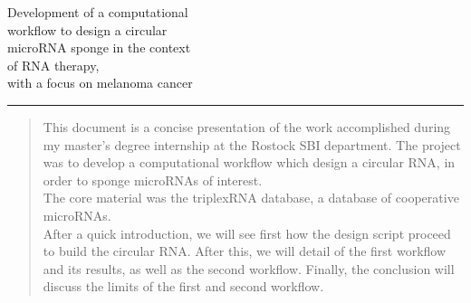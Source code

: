 \documentclass[a4paper,12pt]{report}
\begin{document}
\begin{titlepage}
	\BgThispage
	\vspace*{0.11\textheight}
	\noindent
	\textcolor{yourcolor}{\Huge{Development of a computational \\ \newline  workflow to design a circular \\ \newline microRNA sponge  in the context \\ \newline of RNA therapy,\\ \newline with a focus on melanoma cancer  }}
	
	\vspace*{4cm}\par
	
	\noindent
	\begin{minipage}{0.30\linewidth}
		\begin{flushright}
			\printauthor
		\end{flushright}
	\end{minipage} \hspace{15pt}
	\begin{minipage}{0.05\linewidth}       %
		\rule{1pt}{175pt}                   %
	\end{minipage} \hspace{-10pt}
	\begin{minipage}{0.60\linewidth}
		\vspace{5pt}
		\begin{abstract} 
			This document is a concise presentation of the work accomplished during my master's degree internship at the Rostock SBI department. The project was to develop a computational workflow which design a circular RNA, in order to sponge microRNAs of interest. \\ The core material was the triplexRNA database, a database of cooperative microRNAs. \\
			After a quick introduction, we will see first how the design script proceed to build the circular RNA. 
			After this, we will detail of the first workflow and its results, as well as the second workflow. 
			Finally, the conclusion will discuss the limits of the first and second workflow.
		\end{abstract}
	\end{minipage}
\end{titlepage}
\end{document}
